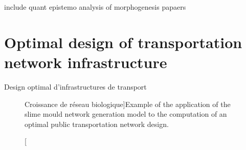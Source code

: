 
include quant epistemo analysis of morphogenesis papaers










\stars

\newpage






\section{Optimal design of transportation network infrastructure}{Design optimal d'infrastructures de transport}

\label{app:sec:biological}





\begin{figure}
\caption[Biological Network Growth][Croissance de réseau biologique]{Example of the application of the slime mould network generation model to the computation of an optimal public transportation network design.}{}
\label{fig:slimemould}
\end{figure}

